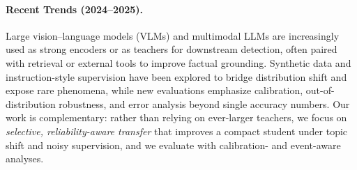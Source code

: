 \paragraph{Recent Trends (2024--2025).}
Large vision--language models (VLMs) and multimodal LLMs are increasingly used as strong encoders or as teachers for downstream detection, often paired with retrieval or external tools to improve factual grounding. Synthetic data and instruction-style supervision have been explored to bridge distribution shift and expose rare phenomena, while new evaluations emphasize calibration, out-of-distribution robustness, and error analysis beyond single accuracy numbers. Our work is complementary: rather than relying on ever-larger teachers, we focus on \emph{selective, reliability-aware transfer} that improves a compact student under topic shift and noisy supervision, and we evaluate with calibration- and event-aware analyses.
